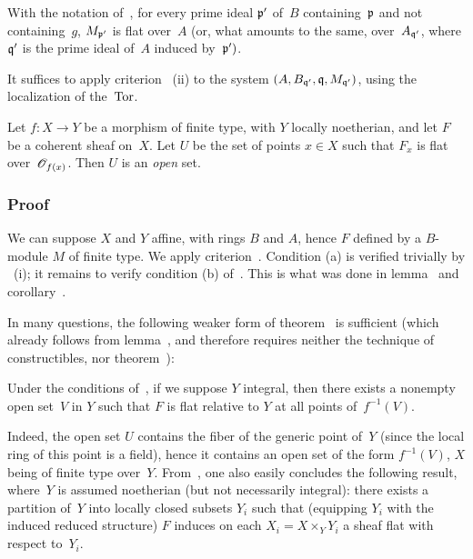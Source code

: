 \begin{corollary}
\label{IV.6.9}
With the notation of~, for every prime ideal
$\mathfrak{p}'$ of~$B$ containing~$\mathfrak{p}$ and not containing~$g$,
$M_{\mathfrak{p}'}$ is flat over~$A$ (or, what amounts to the same, over~$A_{\mathfrak{q}'}$, where $\mathfrak{q}'$ is the prime ideal of~$A$
induced by~$\mathfrak{p}')$.
\end{corollary}
It suffices to apply criterion~ (ii) to the system
$(A, B_{\mathfrak{q}'}, \mathfrak{q}, M_{\mathfrak{q'}})$, using the
localization of the~$\operatorname{Tor}$.
\begin{theorem}
\label{IV.6.10}
Let $f\colon X\to Y$ be a morphism of finite type, with $Y$ locally
noetherian, and let $F$ be a coherent sheaf on~$X$. Let $U$
be the set of points $x\in X$ such that $F_x$ is flat over~$\cal{O}_{f(x)}$. Then $U$ is an \emph{open} set.
\end{theorem}

\subsubsection*{Proof} We can suppose $X$ and $Y$ affine, with rings $B$
and $A$, hence $F$ defined by a $B$-module $M$ of finite type. We
apply criterion~. Condition (a) is
verified trivially by ~(i); it remains to
verify condition (b) of~. This is what was
done in lemma~ and
corollary~.

In many questions, the following weaker form of
theorem~ is sufficient (which already follows
from lemma~, and therefore requires neither the
technique
of constructibles, nor theorem~):
\begin{corollary}
\label{IV.6.11}
Under the conditions of~, if we suppose $Y$ integral,
then there exists a nonempty open set~$V$ in $Y$ such that $F$ is flat
relative to $Y$ at all points of~$f^{-1}(V)$.
\end{corollary}
Indeed, the open set $U$ contains the fiber of the generic
point of~$Y$ (since the local ring of this point is a
field), hence it contains an open set of the form $f^{-1}(V)$, $X$
being of finite type over~$Y$. From~, one also
easily concludes the following result, where~$Y$ is assumed
noetherian (but not necessarily integral): there exists
a partition of~$Y$ into locally closed subsets $Y_i$
such that (equipping $Y_i$ with the induced reduced structure) $F$
induces on each $X_i=X\times_Y Y_i$ a sheaf flat with respect
to~$Y_i$.
